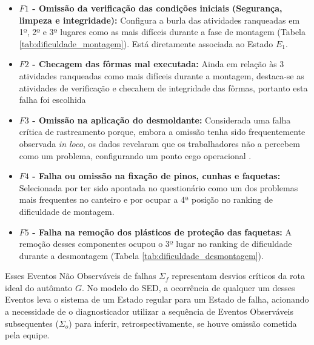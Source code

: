 \begin{itemize}
	\item \textbf{$F1$ - Omissão da verificação das condições iniciais (Segurança, limpeza e integridade):} Configura a burla das atividades ranqueadas em 1º, 2º e 3º lugares como as mais difíceis durante a fase de montagem (Tabela \ref{tab:dificuldade_montagem}). Está diretamente associada ao Estado $E_1$.
	
	\item \textbf{$F2$ - Checagem das fôrmas mal executada:} Ainda em relação às 3 atividades ranqueadas como mais difíceis durante a montagem, destaca-se as atividades de verificação e checahem de integridade das fôrmas, portanto esta falha foi escolhida
	
	\item \textbf{$F3$ - Omissão na aplicação do desmoldante:} Considerada uma falha crítica de rastreamento porque, embora a omissão tenha sido frequentemente observada \textit{in loco}, os dados revelaram que os trabalhadores não a percebem como um problema, configurando um ponto cego operacional \cite{tesecarol}.
	\item \textbf{$F4$ - Falha ou omissão na fixação de pinos, cunhas e faquetas:} Selecionada por ter sido apontada no questionário como um dos problemas mais frequentes no canteiro e por ocupar a 4ª posição no ranking de dificuldade de montagem.
	\item \textbf{$F5$ - Falha na remoção dos plásticos de proteção das faquetas:} A remoção desses componentes ocupou o 3º lugar no ranking de dificuldade durante a desmontagem (Tabela \ref{tab:dificuldade_desmontagem}).
\end{itemize}

Esses Eventos Não Observáveis de falhas $\Sigma_f$ representam desvios críticos da rota ideal do autômato $G$. No modelo do SED, a ocorrência de qualquer um desses Eventos leva o sistema de um Estado regular para um Estado de falha, acionando a necessidade de o diagnosticador utilizar a sequência de Eventos Observáveis subsequentes ($\Sigma_o$) para inferir, retrospectivamente, se houve omissão cometida pela equipe.

